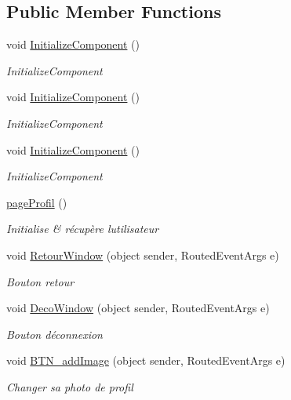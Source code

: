 \subsection*{Public Member Functions}
\begin{DoxyCompactItemize}
\item 
void \hyperlink{classnewPizza1_1_1pageProfil_a53ca6e755a62dfda0434ae88b7355d3e}{Initialize\+Component} ()
\begin{DoxyCompactList}\small\item\em Initialize\+Component \end{DoxyCompactList}\item 
void \hyperlink{classnewPizza1_1_1pageProfil_a53ca6e755a62dfda0434ae88b7355d3e}{Initialize\+Component} ()
\begin{DoxyCompactList}\small\item\em Initialize\+Component \end{DoxyCompactList}\item 
void \hyperlink{classnewPizza1_1_1pageProfil_a53ca6e755a62dfda0434ae88b7355d3e}{Initialize\+Component} ()
\begin{DoxyCompactList}\small\item\em Initialize\+Component \end{DoxyCompactList}\item 
\hyperlink{classnewPizza1_1_1pageProfil_a07e57420aca7af196086a365421e0d3c}{page\+Profil} ()
\begin{DoxyCompactList}\small\item\em Initialise \& récupère l\textquotesingle{}utilisateur \end{DoxyCompactList}\item 
void \hyperlink{classnewPizza1_1_1pageProfil_a070f5a762875f6b8eef7438cb8f550d8}{Retour\+Window} (object sender, Routed\+Event\+Args e)
\begin{DoxyCompactList}\small\item\em Bouton retour \end{DoxyCompactList}\item 
void \hyperlink{classnewPizza1_1_1pageProfil_a151edd470a4e7c5cab93709ef0921c1b}{Deco\+Window} (object sender, Routed\+Event\+Args e)
\begin{DoxyCompactList}\small\item\em Bouton déconnexion \end{DoxyCompactList}\item 
void \hyperlink{classnewPizza1_1_1pageProfil_a2a3ca4fec9cf0f5a3b5a802a82e38757}{B\+T\+N\+\_\+add\+Image} (object sender, Routed\+Event\+Args e)
\begin{DoxyCompactList}\small\item\em Changer sa photo de profil \end{DoxyCompactList}\end{DoxyCompactItemize}
